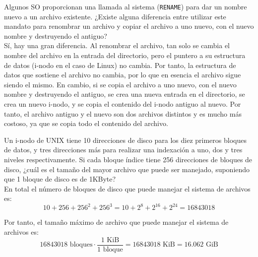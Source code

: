 \begin{ejercicio}
Algunos SO proporcionan una llamada al sistema (\verb|RENAME|) para dar un nombre nuevo a un archivo existente.
¿Existe alguna diferencia entre utilizar este mandato para renombrar un archivo y copiar el archivo a uno nuevo,
con el nuevo nombre y destruyendo el antiguo?\\

Sí, hay una gran diferencia. Al renombrar el archivo, tan solo se cambia el nombre del archivo en la entrada del directorio,
pero el puntero a su estructura de datos (i-nodo en el caso de Linux) no cambia. Por tanto, la estructura de datos que sostiene el archivo
no cambia, por lo que en esencia el archivo sigue siendo el mismo.
En cambio, si se copia el archivo a uno nuevo, con el nuevo nombre y destruyendo el antiguo, se crea una nueva entrada en el directorio,
se crea un nuevo i-nodo, y se copia el contenido del i-nodo antiguo al nuevo.
Por tanto, el archivo antiguo y el nuevo son dos archivos distintos y es mucho más costoso, ya que se copia todo el contenido del archivo.
\end{ejercicio}

\begin{ejercicio}
Un i-nodo de UNIX tiene 10 direcciones de disco para los diez primeros bloques de datos, y tres direcciones más para realizar una indexación a uno, dos y tres niveles respectivamente.
Si cada bloque índice tiene 256 direcciones de bloques de disco, ¿cuál es el tamaño del mayor archivo que puede ser manejado, suponiendo que 1 bloque de disco es de 1KByte?\\
    
    En total el número de bloques de disco que puede manejar el sistema de archivos es:
    \begin{equation*}
        10 + 256 + 256^2 + 256^3 = 10 + 2^{8} + 2^{16} + 2^{24} = 16843018
    \end{equation*}

    Por tanto, el tamaño máximo de archivo que puede manejar el sistema de archivos es:
    \begin{equation*}
        16843018 \text{ bloques} \cdot \frac{1 \text{ KiB}}{1 \text{ bloque}} = 16843018 \text{ KiB} = 16.062 \text{ GiB}
    \end{equation*}
\end{ejercicio}

